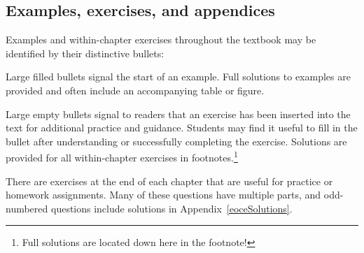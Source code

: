 

\subsection*{Examples, exercises, and appendices}

Examples and within-chapter exercises throughout the textbook may be identified by their distinctive bullets:

\begin{example}{Large filled bullets signal the start of an example.}
Full solutions to examples are provided and often include an accompanying table or figure.
 \end{example}

\begin{exercise}
Large empty bullets signal to readers that an exercise has been inserted into the text for additional practice and guidance. Students may find it useful to fill in the bullet after understanding or successfully completing the exercise. Solutions are provided for all within-chapter exercises in footnotes.\footnote{Full solutions are located down here in the footnote!}
\end{exercise}

There are exercises at the end of each chapter that are useful for practice or homework assignments. Many of these questions have multiple parts, and odd-numbered questions include solutions in Appendix~\ref{eoceSolutions}. %

